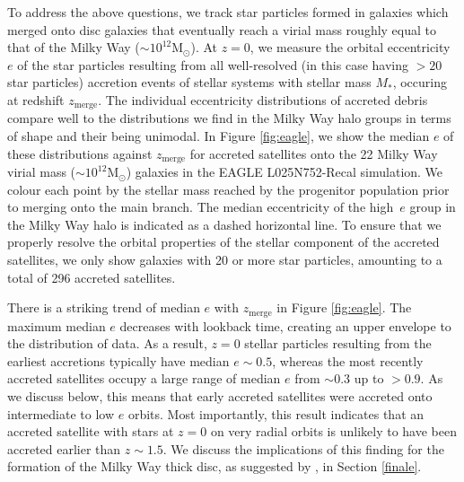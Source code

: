 To address the above questions, we track star particles formed in
galaxies which merged onto disc galaxies that eventually reach a
virial mass roughly equal to that of the Milky Way ($\sim 10^{12}
\mathrm{M_{\odot}}$). At $z=0$, we measure the orbital eccentricity
$e$ of the star particles resulting from all well-resolved (in this case having $>20$ star particles) accretion
events of stellar systems with stellar mass $M_*$, occuring at
redshift $z_\mathrm{merge}$.  The individual eccentricity distributions
of accreted debris compare well to the distributions we find in the
Milky Way halo groups in terms of shape and their being unimodal. In Figure
\ref{fig:eagle}, we show the median $e$ of these distributions
against $z_\mathrm{merge}$ for accreted satellites onto the 22 Milky
Way virial mass ($\sim 10^{12} \mathrm{M_{\odot}}$) galaxies in the
EAGLE L025N752-Recal simulation.  We colour each point by the stellar
mass reached by the progenitor population prior to merging onto the
main branch. The median eccentricity of the high~$e$ group in the
Milky Way halo is indicated as a dashed horizontal line. To ensure
that we properly resolve the orbital properties of the stellar
component of the accreted satellites, we only show galaxies with
20 or more star particles, amounting to a total of 296 accreted
satellites.

There is a striking trend of median $e$ with $z_{\mathrm{merge}}$
in Figure \ref{fig:eagle}. The maximum median $e$ decreases with
lookback time, creating an upper envelope to the distribution of
data.  As a result, $z=0$ stellar particles resulting from the
earliest accretions typically have median $e\sim0.5$, whereas the
most recently accreted satellites occupy a large range of median
$e$ from $\sim 0.3$ up to $> 0.9$.  As we discuss below, this means
that early accreted satellites were accreted onto intermediate to
low $e$ orbits.  Most importantly, this result indicates that an
accreted satellite with stars at $z=0$ on very radial orbits is
unlikely to have been accreted earlier than $z\sim1.5$. We discuss
the implications of this finding for the formation of the Milky Way
thick disc, as suggested by \citet{2018arXiv180606038H}, in Section
\ref{finale}.

